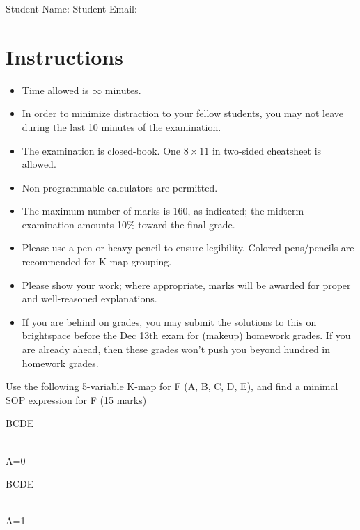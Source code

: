 \maketitle

Student Name: \hfill Student Email: \hspace{10em}
\section{Instructions}
\begin{itemize}
  \item Time allowed is $\infty$ minutes.
  \item In order to minimize distraction to your fellow students, you may not leave
  during the last 10 minutes of the examination.
  \item The examination is closed-book. One $8\times11$ in two-sided cheatsheet is allowed.
  \item Non-programmable calculators are permitted.
  \item The maximum number of marks is 160, as indicated; the midterm examination
  amounts 10\% toward the final grade.
  \item Please use a pen or heavy pencil to ensure legibility. Colored
    pens/pencils are recommended for K-map grouping.
  \item Please show your work; where appropriate, marks will be awarded for proper and well-reasoned explanations.
  \item If you are behind on grades, you may submit the solutions to this on brightspace before the Dec 13th exam for (makeup) homework grades. If you are already ahead, then these grades won't push you beyond hundred in homework grades.
\end{itemize}

\begin{prob}
Use the following 5-variable K-map for F (A, B, C, D, E), and find
  a minimal SOP expression for F (15 marks)\\
\begin{minipage}{0.5\linewidth}
  \centering
  \begin{Karnaugh}{BC}{DE}
  \end{Karnaugh}\\
  A=0
\end{minipage}%
\begin{minipage}{0.5\linewidth}
  \centering
  \begin{Karnaugh}{BC}{DE}
  \end{Karnaugh}\\
  A=1
\end{minipage}
\end{prob}

